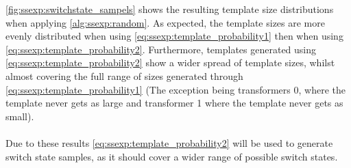 \autoref{fig:ssexp:switchstate_sampels} shows the resulting template size
distributions when applying \autoref{alg:ssexp:random}. As expected, the
template sizes are more evenly distributed when 
using \autoref{eq:ssexp:template_probability1}
then when using \autoref{eq:ssexp:template_probability2}. 
Furthermore, templates generated using
\autoref{eq:ssexp:template_probability2} show a wider
spread of template sizes, whilst almost covering the full range
of sizes generated through \autoref{eq:ssexp:template_probability1}
(The exception being transformers 0, where the template 
never gets as large and transformer 1 where the template never 
gets as small).\\
\\
Due to these results \autoref{eq:ssexp:template_probability2} will
be used to generate switch state samples, as it should cover a wider
range of possible switch states.
